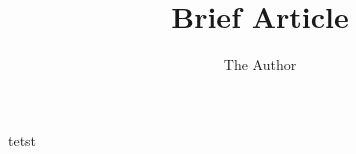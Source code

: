 \documentclass[11pt, oneside]{book}   	%
\title{Brief Article}
\author{The Author}
\begin{document}
\prntlen{\textwidth}
\maketitle
\tableofcontents
\modulolinenumbers[5]
\linenumbers




%
%
%
%
%

%
%
%
%


tetst \cite{RbDataLineSteck}
\end{document}
